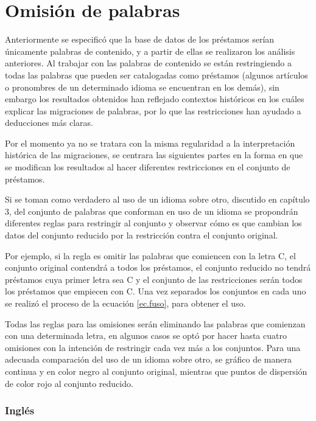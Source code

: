\chapter{Omisión de palabras}

Anteriormente se especificó que la base de datos de los préstamos serían únicamente palabras de contenido, y a partir de ellas se realizaron los análisis anteriores.  Al trabajar con las palabras de contenido se están restringiendo a todas las palabras que pueden ser catalogadas como préstamos (algunos artículos o pronombres de un determinado idioma se encuentran en los demás), sin embargo los resultados obtenidos han reflejado contextos históricos en los cuáles explicar las migraciones de palabras, por lo que las restricciones han ayudado a deducciones más claras. 

Por el momento ya no se tratara con la misma regularidad a la interpretación histórica de las migraciones, se centrara las siguientes partes en la forma en que se modifican los resultados al hacer diferentes restricciones en el conjunto de préstamos. 

Si se toman como verdadero al uso de un idioma sobre otro, discutido en capítulo 3,  del conjunto de palabras que conforman en uso de un idioma se propondrán diferentes reglas para restringir al conjunto y observar cómo es que cambian los datos del conjunto reducido por la restricción contra el conjunto original.  

Por ejemplo,  si la regla es omitir las palabras que comiencen con la letra C,  el conjunto original contendrá a todos los préstamos,  el conjunto reducido  no tendrá  préstamos cuya primer letra sea C y el conjunto de las restricciones serán todos los préstamos que empiecen con C. Una vez separados los conjuntos en cada uno se realizó el proceso de  la ecuación \ref{ec.fuso}, para obtener el uso.

Todas las reglas para las omisiones serán eliminando las palabras que comienzan con una determinada letra, en algunos casos se optó por hacer hasta cuatro omisiones con la intención de restringir cada vez más a los conjuntos.  Para una adecuada comparación del uso de un idioma sobre otro, se gráfico de manera continua y  en color negro al conjunto original,  mientras que puntos de dispersión de color rojo al conjunto reducido.


\newpage
\subsection{Inglés}

